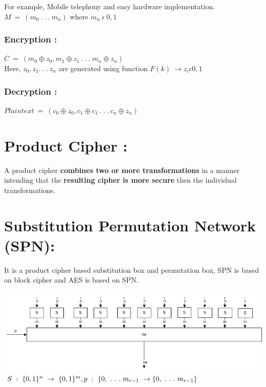 \documentclass[11pt]{article}
\begin{document}
For example, Mobile telephony and easy hardware implementation.\\

$M\ =\ (m_0\ .\ .\ .\ m_n)$ where $m_n\ \epsilon \ {0,1}$
\subsubsection[*]{Encryption :}

$C\ =\ (m_0 \oplus z_0 ,m_1 \oplus z_1\ .\ .\ .\ m_n \oplus z_n) $\\

Here, $z_0,z_1 .\ .\ .\ z_n$ are generated using function $F(k)\ \rightarrow z_i \epsilon {0,1}$

\subsubsection[*]{Decryption :}

$Plain text \ =\ (c_0 \oplus z_0 ,c_1 \oplus c_1\ .\ .\ .\ c_n \oplus z_n) $\\

\newpage

\section{Product Cipher :}
A product cipher \textbf{combines two or more transformations} in a manner intending that the \textbf{resulting cipher is more secure} then the individual transformations.

\section{Substitution Permutation Network (SPN):}
It is a product cipher based substitution box and permutation box,
SPN is based on block cipher and AES is based on SPN.\\\\
\includegraphics[scale=0.6]{Images/L4/SPN.png}\\

$ S\ :\ \{0,1\}^n\ \rightarrow \ \{0,1\}^m ,\\
p\ :\ \{0,\ .\ .\ .\ m_{r-1}\ \rightarrow \{0,\ .\ .\ .\ m_{r-1} \} $
\end{document}
